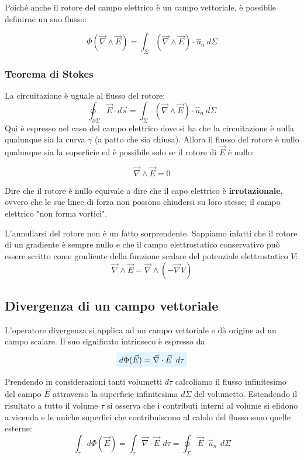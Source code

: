 \documentclass[x11names]{report}
\newcommand{\teorema}[2]{
	\begin{center}
		\fboxsep11pt
		\colorbox{myred}{\begin{minipage}{5.75in}
				\begin{redes}{#1}
					#2
				\end{redes}
		\end{minipage}}
	\end{center}
}
\newcommand{\viola}[1]{%
	\colorbox{myblue}{$\displaystyle #1$}
}
\begin{document}
Poiché anche il rotore del campo elettrico è un campo vettoriale, è possibile definirne un suo flusso:

\[
\Phi(\vec{\nabla} \wedge \vec{E}) =  \int_{\Sigma}\left(\vec{\nabla} \wedge \vec{E}\right)\cdot \hat{u}_n \: d\Sigma
\]

\teorema{}{\label{stokes}
\subsubsection{Teorema di Stokes}
La circuitazione è uguale al flusso del rotore:
\[
\oint_{\partial\Sigma} \vec{E}\cdot d\vec{s} = \int_{\Sigma}\left(\vec{\nabla} \wedge \vec{E}\right)\cdot \hat{u}_n \: d\Sigma
\]
Qui è espresso nel caso del campo elettrico dove si ha che la circuitazione è nulla qualunque sia la curva \(\gamma\) (a patto che sia chiusa). Allora il flusso del rotore è nullo qualunque sia la superficie ed è possibile solo se il rotore di \(\vec{E}\) è nullo:

\[
\vec{\nabla} \wedge \vec{E} = 0
\]

Dire che il rotore è nullo equivale a dire che il capo elettrico è \textbf{irrotazionale}, ovvero che le sue linee di forza non possono chiudersi su loro stesse; il campo elettrico "non forma vortici".
}

L'annullarsi del rotore non è un fatto sorprendente. Sappiamo infatti che il rotore di un gradiente è sempre nullo e che il campo elettrostatico conservativo può essere scritto come gradiente della funzione scalare del potenziale elettrostatico \(V\):
\[
\vec{\nabla} \wedge \vec{E} = \vec{\nabla} \wedge \left(-\vec{\nabla} V\right)
\]

\subsection{Divergenza di un campo vettoriale}
L'operatore divergenza si applica ad un campo vettoriale e dà origine ad un campo scalare. Il suo significato intrinseco è espresso da 
\begin{equation}
	\viola{d\Phi(\vec{E}) = \vec{\nabla}\cdot\vec{E}\,\ d\tau}
\end{equation}


Prendendo in considerazioni tanti volumetti \(d\tau\) calcoliamo il flusso infinitesimo del campo \(\vec{E}\) attraverso la superficie infinitesima \(d\Sigma\) del volumetto. Estendendo il risultato a tutto il volume \(\tau\) si osserva che i contributi interni al volume si elidono a vicenda e le uniche superfici che contribuiscono al calolo del flusso sono quelle esterne:
\[
\int_\tau d\Phi(\vec{E}) = \int_\tau  \vec{\nabla}\cdot\vec{E}\,\ d\tau = \oint_\Sigma \vec{E}\cdot\hat{u}_n \,\ d\Sigma
\]
\end{document}
